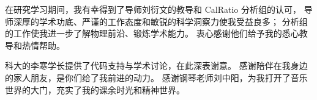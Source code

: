 
\begin{acknowledgements}

    在研究学习期间，我有幸得到了导师刘衍文的教导和 CalRatio 分析组的认可，
    导师深厚的学术功底、严谨的工作态度和敏锐的科学洞察力使我受益良多；
    分析组的工作使我进一步了解物理前沿、锻炼学术能力。
    衷心感谢他们给予我的悉心教导和热情帮助。

    科大的李寒学长提供了代码支持与学术讨论，在此深表谢意。
    感谢陪伴在我身边的家人朋友，是你们给了我前进的动力。
    感谢钢琴老师刘中阳，为我打开了音乐世界的大门，充实了我的课余时光和精神世界。

\end{acknowledgements}

